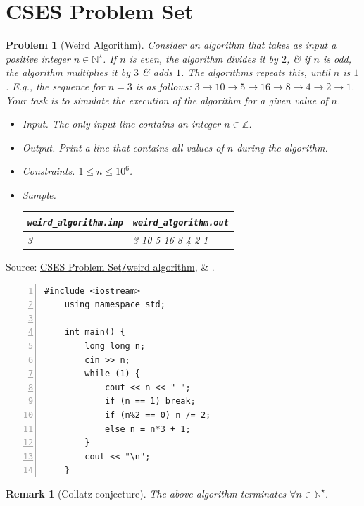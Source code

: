 \documentclass{article}
\newtheorem{problem}{Problem}
\newtheorem{remark}{Remark}
\begin{document}

\section{CSES Problem Set}

\begin{problem}[Weird Algorithm]
	Consider an algorithm that takes as input a positive integer $n\in\mathbb{N}^\star$. If $n$ is even, the algorithm divides it by $2$, \& if $n$ is odd, the algorithm multiplies it by $3$ \& adds $1$. The algorithms repeats this, until $n$ is $1$. E.g., the sequence for $n = 3$ is as follows: $3\to10\to5\to16\to8\to4\to2\to1$. Your task is to simulate the execution of the algorithm for a given value of $n$.
	\begin{itemize}
		\item {\sf Input.} The only input line contains an integer $n\in\mathbb{Z}$.
		\item {\sf Output.} Print a line that contains all values of $n$ during the algorithm.
		\item {\sf Constraints.} $1\le n\le10^6$.
		\item {\sf Sample.}
		\begin{table}[H]
			\centering
			\begin{tabular}{|l|l|}
				\hline
				\verb|weird_algorithm.inp| & \verb|weird_algorithm.out| \\
				\hline
				3 & 3 10 5 16 8 4 2 1 \\
				\hline
			\end{tabular}
		\end{table}
	\end{itemize}
\end{problem}
Source: \href{https://cses.fi/problemset/task/1068}{CSES Problem Set{\tt/}weird algorithm}, \& \cite[Sect. 1.3, pp. 5--7]{Laaksonen2020}.

\begin{Verbatim}[numbers=left,xleftmargin=5mm]
	#include <iostream>
	using namespace std;
	
	int main() {
		long long n;
		cin >> n;
		while (1) {
			cout << n << " ";
			if (n == 1) break;
			if (n%2 == 0) n /= 2;
			else n = n*3 + 1;
		}
		cout << "\n";
	}
\end{Verbatim}

\begin{remark}[Collatz conjecture]
	The above algorithm terminates $\forall n\in\mathbb{N}^\star$.
\end{remark}
\end{document}
